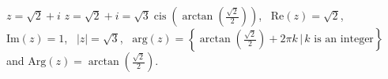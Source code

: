 { $z = \sqrt{2} + i$}
{ $z = \sqrt{2}+i = \sqrt{3}\operatorname{cis}\left(\arctan\left(\frac{\sqrt{2}}{2}\right)\right)$, \, $\text{Re}(z) = \sqrt{2}$, \, $\text{Im}(z) = 1$, \, $|z| = \sqrt{3}$, \, $\text{arg}(z) = \left\{\arctan\left(\frac{\sqrt{2}}{2}\right) + 2\pi k \, | \, \text{$k$ is an integer} \right\}$ and $\text{Arg}(z) =\arctan\left(\frac{\sqrt{2}}{2}\right) $.}
